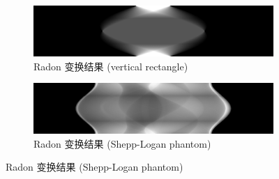 \documentclass{article}
\begin{document}
\begin{figure}[H]
    \centering
    \begin{subfigure}{0.45\textwidth}
        \includegraphics[width=\textwidth]{../result_1_2/vertical_rectangle_1.png}
        \caption{Radon 变换结果 (vertical rectangle)}
    \end{subfigure}
    \hfill
    \begin{subfigure}{0.45\textwidth}
        \includegraphics[width=\textwidth]{../result_1_2/shepp-logan_phantom_1.png}
        \caption{Radon 变换结果 (Shepp-Logan phantom)}
    \end{subfigure}
    

\end{figure}
\end{document}
